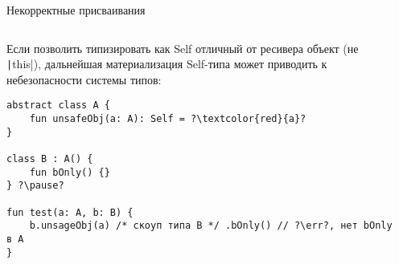 \documentclass[aspectratio=169,usenames,dvipsnames]{beamer}
\newcommand{\err}[0]{\textcolor{red}{ошибка}}
\begin{document}
    \begin{frame}[fragile]{Некорректные присваивания}
        \begin{columns}[onlytextwidth]
            \begin{column}{0.99\textwidth}
                Если позволить типизировать как Self отличный от ресивера объект (не \texttt|this|), дальнейшая материализация Self-типа может приводить к небезопасности системы типов:
                \pause
                \begin{verbatim}
abstract class A {
    fun unsafeObj(a: A): Self = ?\textcolor{red}{a}?
}

class B : A() {
    fun bOnly() {}
} ?\pause?

fun test(a: A, b: B) {
    b.unsageObj(a) /* скоуп типа B */ .bOnly() // ?\err?, нет bOnly в A
}
                \end{verbatim}
            \end{column}\hfill%
            \begin{column}{0.0\textwidth}
            \end{column}
        \end{columns}
    \end{frame}
\end{document}
